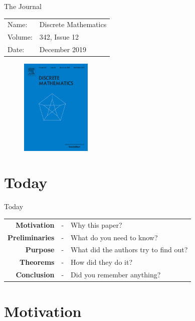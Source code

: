 \documentclass[10pt, compress]{beamer}
\begin{document}
\begin{frame}{The Journal}
\begin{table}
\centering
\begin{tabular}{l l}
Name: & Discrete Mathematics\\
Volume: & 342, Issue 12\\
Date: & December 2019
\end{tabular}
\end{table}
\begin{figure}[!tbp]
\centering
\includegraphics[width=0.3\textwidth]{figures/journal.jpg}
\end{figure}
\end{frame}

\section{Today}

\begin{frame}{Today}
\begin{table}
\def\arraystretch{1.5}
\raggedright
\begin{tabular}{r c l}
\textbf{Motivation} &-& Why this paper?\\
\textbf{Preliminaries} &-& What do you need to know?\\
\textbf{Purpose} &-& What did the authors try to find out?\\
\textbf{Theorems} &-& How did they do it?\\
\textbf{Conclusion} &-& Did you remember anything?\\
\end{tabular}
\end{table}
\end{frame}

\section{Motivation}
\end{document}
